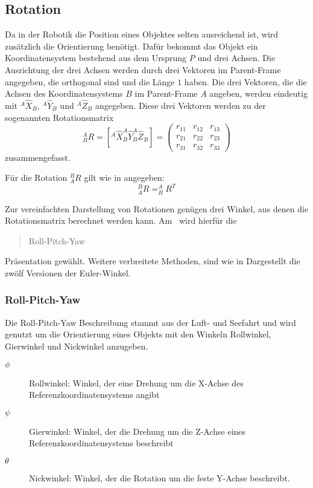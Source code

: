 \subsection{Rotation}
\label{sub:Rotation}

Da in der Robotik die Position eines Objektes selten ausreichend ist, wird zusätzlich 
die Orientierung benötigt. Dafür bekommt das Objekt ein Koordinatensystem bestehend
aus dem Ursprung $P$ und drei Achsen. Die Ausrichtung der drei Achsen werden durch
drei Vektoren im Parent-Frame angegeben, die orthogonal sind und die Länge $1$
haben. Die drei Vektoren, die die Achsen des Koordinatensystems $B$ im Parent-Frame
$A$ angeben, werden eindeutig mit $^A\hat{X}_B$, $^A\hat{Y}_B$ und $^A\hat{Z}_B$
angegeben. Diese drei Vektoren werden zu der sogenannten Rotationsmatrix
\begin{equation}
  ^A_BR = [ ^A\hat{X}_B ^A\hat{Y}_B ^A\hat{Z}_B ] = \begin{pmatrix}
    r_{11}&r_{12}&r_{13}\\
    r_{21}&r_{22}&r_{23}\\
    r_{31}&r_{32}&r_{33}
  \end{pmatrix}
  \label{eq:rotationsmatrix}
\end{equation}
zusammengefasst.

Für die Rotation $^B_AR$ gilt wie in \cite{craig2005} angegeben:
\begin{equation}
  ^B_AR=^A_BR^T
\end{equation}


Zur vereinfachten Darstellung von Rotationen genügen drei Winkel, aus denen die
Rotationsmatrix berechnet werden kann. Am \cob\ wird hierfür die \begin{quote}Roll-Pitch-Yaw\end{quote}
Präsentation gewählt. Weitere verbreitete Methoden, sind wie in \cite{sciavicco2000modelling} 
Dargestellt die zwölf Versionen der Euler-Winkel.

\subsubsection{Roll-Pitch-Yaw}
\label{ssub:Roll-Pitch-Yaw}

Die Roll-Pitch-Yaw Beschreibung stammt aus der Luft- und Seefahrt und wird genutzt
um die Orientierung eines Objekts mit den Winkeln Rollwinkel, Gierwinkel und 
Nickwinkel anzugeben.
\begin{description}
  \item[$\phi$]Rollwinkel: Winkel, der eine Drehung um die X-Achse des Referenzkoordinatensystems
    angibt
  \item[$\psi$]Gierwinkel: Winkel, der die Drehung um die Z-Achse eines Referenzkoordinatensystems
    beschreibt
  \item[$\theta$]Nickwinkel: Winkel, der die Rotation um die feste Y-Achse beschreibt.

\end{description}


